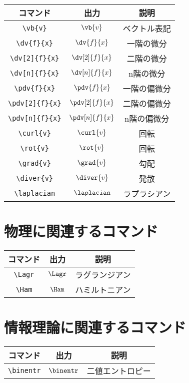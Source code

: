 \begin{longtable}{ccc}
    \toprule
    コマンド             & 出力                            & 説明         \\
    \midrule
    \verb|\vb{v}|        & \(\vb{v}\)                      & ベクトル表記 \\
    \verb|\dv{f}{x}|     & \(\displaystyle \dv{f}{x}\)     & 一階の微分   \\
    \verb|\dv[2]{f}{x}|  & \(\displaystyle \dv[2]{f}{x}\)  & 二階の微分   \\
    \verb|\dv[n]{f}{x}|  & \(\displaystyle \dv[n]{f}{x}\)  & n階の微分    \\
    \verb|\pdv{f}{x}|    & \(\displaystyle \pdv{f}{x}\)    & 一階の偏微分 \\
    \verb|\pdv[2]{f}{x}| & \(\displaystyle \pdv[2]{f}{x}\) & 二階の偏微分 \\
    \verb|\pdv[n]{f}{x}| & \(\displaystyle \pdv[n]{f}{x}\) & n階の偏微分  \\
    \verb|\curl{v}|      & \(\displaystyle \curl{v}\)      & 回転         \\
    \verb|\rot{v}|       & \(\displaystyle \rot{v}\)       & 回転         \\
    \verb|\grad{v}|      & \(\displaystyle \grad{v}\)      & 勾配         \\
    \verb|\diver{v}|     & \(\displaystyle \diver{v}\)     & 発散         \\
    \verb|\laplacian|    & \(\displaystyle \laplacian\)    & ラプラシアン \\
    \bottomrule
\end{longtable}

\section{物理に関連するコマンド}

\begin{longtable}{ccc}
    \toprule
    コマンド     & 出力      & 説明           \\
    \midrule
    \verb|\Lagr| & \(\Lagr\) & ラグランジアン \\
    \verb|\Ham|  & \(\Ham\)  & ハミルトニアン \\
    \bottomrule
\end{longtable}

\section{情報理論に関連するコマンド}

\begin{longtable}{ccc}
    \toprule
    コマンド        & 出力         & 説明             \\
    \midrule
    \verb|\binentr| & \(\binentr\) & 二値エントロピー \\
    \bottomrule
\end{longtable}